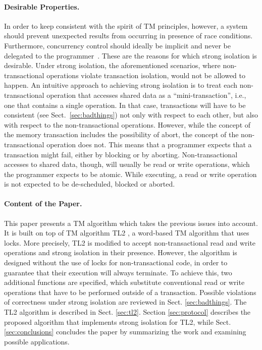 \documentclass[runningheads,a4paper]{llncs}
\begin{document}
\paragraph{Desirable Properties.}
In order  to keep consistent with  the spirit of TM  principles, however, a
system should prevent unexpected   results  from   occurring  
in presence of  race conditions. 
Furthermore, concurrency   control should  ideally be implicit  
and never be delegated to  the programmer~\cite{CIR12,MS12}.  These are the  
reasons for  which strong isolation  is desirable. Under  strong isolation,
the aforementioned scenarios,   where non-transactional operations  violate
transaction isolation, would not be allowed to happen.  
An  intuitive approach  to  achieving  strong isolation  is  to treat  each
non-transactional operation that 
accesses shared data  as a ``mini-transaction'', i.e., one  that contains a
single operation. In that case,  transactions  will have to  be  
consistent (see Sect.~\ref{sec:badthings})  not only with 
respect to each other, but 
also with respect to the  non-transactional operations. However, while the
concept of the memory  transaction includes the possibility of abort,
the concept of the non-transactional operation does not.  This means that a
programmer expects  that a transaction  
might fail,  either by blocking or by  aborting. Non-transactional accesses
to shared data, though,  
will usually be  read or write operations, which  the programmer expects to
be  atomic. While executing, a  read  or write  operation   is  not 
expected  to  be de-scheduled, blocked or aborted.  



\paragraph{Content of the Paper.}
This paper presents  a TM  algorithm which takes the
previous issues into account. It is built on top of 
TM algorithm TL2 \cite{dice06},  a  word-based  TM algorithm  that  uses locks. 
More precisely,  TL2 is modified to accept non-transactional read 
and write operations and strong isolation in their presence.  However,  
the algorithm  is designed  without the use  of locks  for non-transactional
code, in order to guarantee that their execution will always terminate.  
To achieve  this,    two    additional     functions are specified, which substitute 
conventional  read  or write operations that have to be performed  outside  of  a  transaction.  
Possible violations of correctness under strong isolation are reviewed in Sect. 
\ref{sec:badthings}. The TL2 algorithm is described in Sect. \ref{sec:tl2}. 
Section \ref{sec:protocol} describes  the proposed algorithm that implements
strong isolation for TL2, while  
Sect. \ref{sec:conclusions}  concludes the paper by  summarizing the work
and examining possible applications.  
\end{document}
